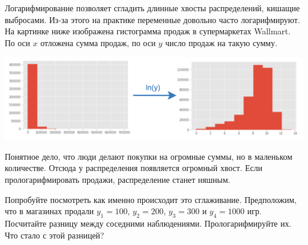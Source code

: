 \documentclass[12pt, a4paper, oneside]{article}
\theoremstyle{plain} %
\theoremstyle{definition}
\begin{document}
\begin{problem}{}
Логарифмирование позволяет сгладить длинные хвосты распределений, кишащие выбросами. Из-за этого на практике переменные довольно часто логарифмируют. На картинке ниже изображена гистограмма продаж в супермаркетах Wallmart. По оси $x$ отложена сумма продаж, по оси $y$ число продаж на такую сумму.  

\begin{center}
	\includegraphics[scale=0.2]{y_lny.png}
\end{center}

Понятное дело, что люди делают покупки на огромные суммы, но в маленьком количестве. Отсюда у распределения появляется огромный хвост. Если прологарифмировать продажи, распределение станет няшным.

Попробуйте посмотреть как именно происходит это сглаживание. Предположим, что в магазинах продали $y_1 =100$, $y_2 = 200$, $y_3 = 300$ и $y_4 = 1000$ игр. Посчитайте разницу между соседними наблюдениями. Прологарифмируйте их. Что стало с этой разницей? 
\end{problem}
\end{document}

